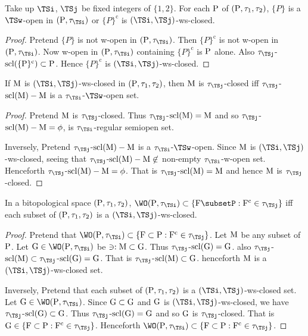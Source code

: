 \begin{thm}\label{thm7.2.30}
Take up $\TSi$, $\TSj$ be fixed integers of $\{1, 2\}$. For each $\mathrm{P}$ of $(\mathrm{P}, \tau_1 , \tau_2 )$, $\{P\}$ is a $\TSw$-open in $(\TSP, \tau_{\TSi} )$ or $\{P\}^{\text{c}}$ is $(\TSi, \TSj)$-ws-closed.
\end{thm}

\begin{proof}
Pretend $\{P\}$ is not w-open in $(\TSP, \tau_{\TSi} )$. Then $\{P\}^{\text{c}}$ is not w-open in $(\TSP, \tau_{\TSi} )$. Now w-open in $(\TSP, \tau_{\TSi} )$ containing $\{P\}^{\text{c}}$ is $\mathrm{P}$ alone. Also $\tau_{\TSj}$-$\mathrm{scl}(\{\mathrm{P}\}^{\text{c}}) \subset \mathrm{P}$. Hence $\{P\}^{\text{c}}$ is $(\TSi, \TSj)$-ws-closed.
\end{proof}

\begin{coro}\label{coro7.2.31}
If $\mathrm{M}$ is $(\TSi, \TSj)$-ws-closed in $(\mathrm{P}, \tau_1 , \tau_2 )$, then $\mathrm{M}$ is $\tau_{\TSj}$-closed iff $\tau_{\TSj}$-$\mathrm{scl}(\mathrm{M})-\mathrm{M}$ is a $\tau_{\TSi}$-$\TSw$-open set.
\end{coro}

\begin{proof}
Pretend $\mathrm{M}$ is $\tau_{\TSj}$-closed. Thus $\tau_{\TSj}$-$\mathrm{scl}(\mathrm{M}) = \mathrm{M}$ and so $\tau_{\TSj}$-$\mathrm{scl}(\mathrm{M})-\mathrm{M}=\phi$, is $\tau_{\TSi}$-regular semiopen set.

Inversely, Pretend $\tau_{\TSj}$-$\mathrm{scl}(\mathrm{M})-\mathrm{M}$ is a $\tau_{\TSi}$-$\TSw$-open. Since $\mathrm{M}$ is $(\TSi, \TSj)$-ws-closed, seeing that $\tau_{\TSj}$-$\mathrm{scl}(\mathrm{M})-\mathrm{M}\not\in$ non-empty $\tau_{\TSi}$-w-open set. Henceforth $\tau_{\TSj}$-$\mathrm{scl}(\mathrm{M})-\mathrm{M}=\phi$. That is $\tau_{\TSj}$-$\mathrm{scl}(\mathrm{M})=\mathrm{M}$ and hence $\mathrm{M}$ is $\tau_{\TSj}$-closed.
\end{proof}

\begin{thm}\label{thm7.2.32}
In a bitopological space $(\mathrm{P}, \tau_1 , \tau_2 )$, $\WO(\TSP, \tau_{\TSi} ) \subset \{\TSF\subsetP: \TSF^{\text{c}} \in\tau_{\TSj}\}$ iff each subset of $(\mathrm{P}, \tau_1 , \tau_2 )$ is a $(\TSi, \TSj)$-ws-closed.
\end{thm}

\begin{proof}
Pretend that $\WO(\TSP, \tau_{\TSi} ) \subset \{\TSF\subset \TSP: \TSF^{\text{c}} \in\tau_{\TSj} \}$. Let $\mathrm{M}$ be any subset of $\mathrm{P}$. Let $\TSG\in \WO(\TSP, \tau_{\TSi} )$ be $\ni: \mathrm{M} \subset \mathrm{G}$. Thus $\tau_{\TSj}$-$\mathrm{scl}(\mathrm{G})=\mathrm{G}$. also $\tau_{\TSj}$-$\scl(\TSM) \subset \tau_{\TSj}$-$\mathrm{scl}(\mathrm{G})=\mathrm{G}$. That is $\tau_{\TSj}$-$\mathrm{scl}(\mathrm{M}) \subset \mathrm{G}$. henceforth $\mathrm{M}$ is a $(\TSi, \TSj)$-ws-closed set.

Inversely, Pretend that each subset of $(\mathrm{P}, \tau_1 , \tau_2 )$ is a $(\TSi, \TSj)$-ws-closed set. Let $\TSG\in \WO(\TSP,\tau_{\TSi} )$. Since $\mathrm{G} \subset \mathrm{G}$ and $\mathrm{G}$ is $(\TSi, \TSj)$-ws-closed, we have $\tau_{\TSj}$-$\mathrm{scl}(\mathrm{G}) \subset \mathrm{G}$. Thus $\tau_{\TSj}$-$\mathrm{scl}(\mathrm{G}) =\mathrm{G}$ and so $\mathrm{G}$ is $\tau_{\TSj}$-closed. That is $\TSG\in\{\TSF\subset \TSP: \TSF^{\text{c}} \in\tau_{\TSj} \}$. Henceforth $\WO(\TSP, \tau_{\TSi} ) \subset \{\TSF\subset \TSP: \TSF^{\text{c}} \in\tau_{\TSj} \}$. 
\end{proof}

